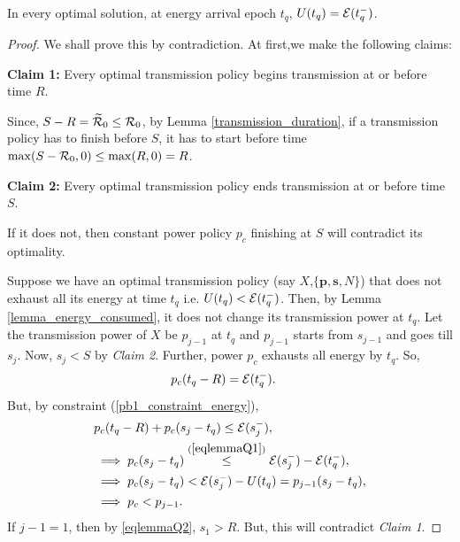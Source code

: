 \begin{lemma}
In every optimal solution, at energy arrival epoch $t_q$, $U(t_q)=\mathcal{E}(t_q^-)$.
\label{lemma_Q}
\end{lemma}
\begin{proof}
We shall prove this by contradiction. At first,we make the following claims:

\textbf{Claim 1:} Every optimal transmission policy begins transmission at or before time $R$.

Since, $S-R=\widetilde{\mathcal{R}}_0\le \mathcal{R}_0$, by Lemma \ref{transmission_duration}, if a transmission policy has to finish before $S$, it has to start before time $\max(S-\mathcal{R}_0,0) \le \max(R,0)=R$. 


\textbf{Claim 2:} Every optimal transmission policy ends transmission at or before time $S$.

If it does not, then constant power policy $p_c$ finishing at $S$ will contradict its optimality.

Suppose we have an optimal transmission policy (say $X$,$\{\bm{p},\bm{s},N\}$) that does not exhaust all its energy at time $t_q$ i.e. $U(t_q)<\mathcal{E}(t_q^-)$. Then, by Lemma \ref{lemma_energy_consumed}, it does not change its transmission power at $t_q$. Let the transmission power of $X$ be $p_{j-1}$ at $t_q$ and $p_{j-1}$ starts from $s_{j-1}$ and goes till $s_j$. Now, $s_j<S$ by \textit{Claim 2}. Further, power $p_c$ exhausts all energy by $t_q$. So,
\begin{align}
&p_c(t_q-R)=\ETx(t_q^-)\label{eqlemmaQ1}.
\end{align}
But, by constraint (\ref{pb1_constraint_energy}),
\begin{align}
&p_c(t_q-R)+p_c(s_j-t_q)\le \ETx(s_j^-),
\\
&\implies p_c(s_j-t_q)\stackrel{(\ref{eqlemmaQ1})}{\le} \ETx(s_j^-)-\ETx(t_q^-),
\\
&\implies p_c(s_j-t_q)< \ETx(s_j^-)-U(t_q)=p_{j-1}(s_j-t_q),
\\
&\implies p_c<p_{j-1} .\label{eqlemmaQ2}
\end{align}
If ${j-1}= 1$, then by \eqref{eqlemmaQ2}, $s_{1}>R$. But, this will contradict \textit{Claim 1}.


\end{proof}
